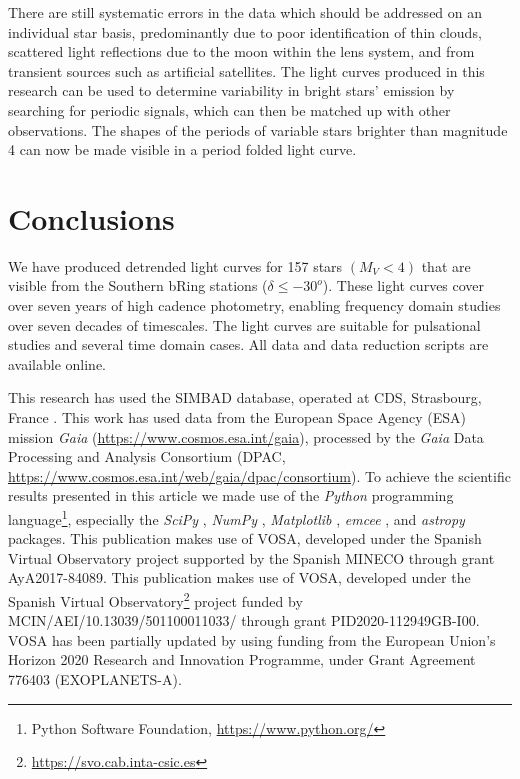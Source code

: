 \documentclass{aa}
\begin{document}
There are still systematic errors in the data which should be addressed on an individual star basis, predominantly due to poor identification of thin clouds, scattered light reflections due to the moon within the lens system, and from transient sources such as artificial satellites.
%
The light curves produced in this research can be used to determine variability in bright stars' emission by searching for periodic signals, which can then be matched up with other observations.
%
%
The shapes of the periods of variable stars brighter than magnitude 4 can now be made visible in a period folded light curve.

\section{Conclusions}

\label{sec:conclusion}

We have produced detrended light curves for 157 stars $(M_V<4)$ that are visible from the Southern bRing stations ($\delta \leq -30^o$).
%
These light curves cover over seven years of high cadence photometry, enabling frequency domain studies over seven decades of timescales.
%
The light curves are suitable for pulsational studies and several time domain cases.
%
All data and data reduction scripts are available online.

\begin{acknowledgements}

This research has used the SIMBAD database, operated at CDS, Strasbourg, France \citep{wenger2000}.
%
This work has used data from the European Space Agency (ESA) mission {\it Gaia} (\url{https://www.cosmos.esa.int/gaia}), processed by the {\it Gaia} Data Processing and Analysis Consortium (DPAC, \url{https://www.cosmos.esa.int/web/gaia/dpac/consortium}).
%
To achieve the scientific results presented in this article we made use of the \emph{Python} programming language\footnote{Python Software Foundation, \url{https://www.python.org/}}, especially the \emph{SciPy} \citep{virtanen2020}, \emph{NumPy} \citep{numpy}, \emph{Matplotlib} \citep{Matplotlib}, \emph{emcee} \citep{foreman-mackey2013}, and \emph{astropy} \citep{astropy_1,astropy_2} packages.
%
This publication makes use of VOSA, developed under the Spanish Virtual Observatory project supported by the Spanish MINECO through grant AyA2017-84089.
%
This publication makes use of VOSA, developed under the Spanish Virtual Observatory\footnote{\url{https://svo.cab.inta-csic.es}} project funded by MCIN/AEI/10.13039/501100011033/ through grant PID2020-112949GB-I00.
%
VOSA has been partially updated by using funding from the European Union's Horizon 2020 Research and Innovation Programme, under Grant Agreement 776403 (EXOPLANETS-A). 
%
\end{acknowledgements}
\end{document}
